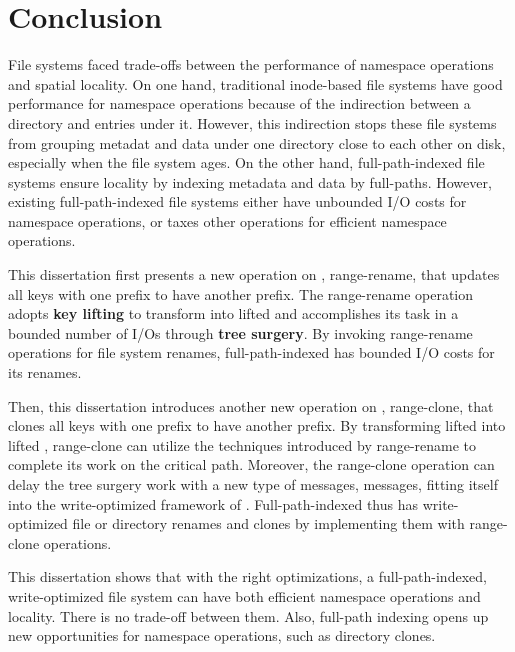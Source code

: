 \chapter{Conclusion}
\label{chap:conclusion}

File systems faced trade-offs between the performance of namespace
operations and spatial locality.
On one hand, traditional inode-based file systems have good performance for namespace
operations because of the indirection between a directory and entries under it.
However, this indirection stops these file systems from grouping metadat and data
under one directory close to each other on disk,
especially when the file system ages.
On the other hand, full-path-indexed file systems ensure locality by indexing
metadata and data by full-paths.
However, existing full-path-indexed file systems either have unbounded I/O costs for
namespace operations, or taxes other operations for efficient namespace operations.

This dissertation first presents a new operation on \bets, range-rename,
that updates all keys with one prefix to have another prefix.
The range-rename operation adopts \textbf{key lifting} to transform \bets into
lifted \bets
and accomplishes its task in a bounded number of I/Os through
\textbf{tree surgery}.
By invoking range-rename operations for file system renames,
full-path-indexed \betrfs has bounded I/O costs for its renames.

Then, this dissertation introduces another new operation on \bets, range-clone,
that clones all keys with one prefix to have another prefix.
By transforming lifted \bets into lifted \bedags, range-clone can utilize
the techniques introduced by range-rename to complete its work on the critical path.
Moreover, the range-clone operation can delay the tree surgery work with a new
type of messages, \goto messages, fitting itself into the write-optimized
framework of \bedags.
Full-path-indexed \betrfs thus has write-optimized file or directory renames and
clones by implementing them with range-clone operations.

This dissertation shows that with the right optimizations, a full-path-indexed,
write-optimized file system can
have both efficient namespace operations and locality.
There is no trade-off between them.
Also, full-path indexing opens up new opportunities for namespace operations,
such as directory clones.

